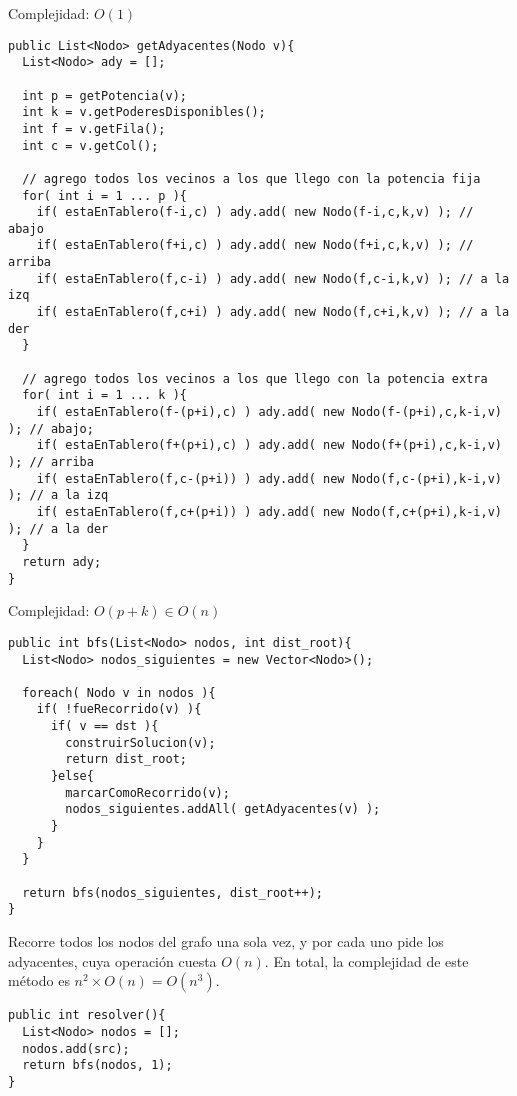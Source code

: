 Complejidad: $O(1)$


\footnotesize\begin{verbatim}
public List<Nodo> getAdyacentes(Nodo v){
  List<Nodo> ady = [];

  int p = getPotencia(v);
  int k = v.getPoderesDisponibles();
  int f = v.getFila();
  int c = v.getCol();

  // agrego todos los vecinos a los que llego con la potencia fija
  for( int i = 1 ... p ){
    if( estaEnTablero(f-i,c) ) ady.add( new Nodo(f-i,c,k,v) ); // abajo
    if( estaEnTablero(f+i,c) ) ady.add( new Nodo(f+i,c,k,v) ); // arriba
    if( estaEnTablero(f,c-i) ) ady.add( new Nodo(f,c-i,k,v) ); // a la izq
    if( estaEnTablero(f,c+i) ) ady.add( new Nodo(f,c+i,k,v) ); // a la der
  }

  // agrego todos los vecinos a los que llego con la potencia extra
  for( int i = 1 ... k ){
    if( estaEnTablero(f-(p+i),c) ) ady.add( new Nodo(f-(p+i),c,k-i,v) ); // abajo;
    if( estaEnTablero(f+(p+i),c) ) ady.add( new Nodo(f+(p+i),c,k-i,v) ); // arriba
    if( estaEnTablero(f,c-(p+i)) ) ady.add( new Nodo(f,c-(p+i),k-i,v) ); // a la izq
    if( estaEnTablero(f,c+(p+i)) ) ady.add( new Nodo(f,c+(p+i),k-i,v) ); // a la der
  }
  return ady;
}
\end{verbatim}\normalsize

Complejidad: $O(p+k) \in O(n)$

\footnotesize\begin{verbatim}
public int bfs(List<Nodo> nodos, int dist_root){
  List<Nodo> nodos_siguientes = new Vector<Nodo>();

  foreach( Nodo v in nodos ){
    if( !fueRecorrido(v) ){
      if( v == dst ){
        construirSolucion(v);
        return dist_root;
      }else{
        marcarComoRecorrido(v);
        nodos_siguientes.addAll( getAdyacentes(v) );
      }
    }
  }

  return bfs(nodos_siguientes, dist_root++);
}
\end{verbatim}\normalsize

Recorre todos los nodos del grafo una sola vez, y por cada uno pide los adyacentes, cuya operaci\'on cuesta $O(n)$. En total, la complejidad de este m\'etodo es $n^2 \times O(n) = O(n^3)$.  

\footnotesize\begin{verbatim}
public int resolver(){
  List<Nodo> nodos = [];
  nodos.add(src);
  return bfs(nodos, 1);
}
\end{verbatim}\normalsize


